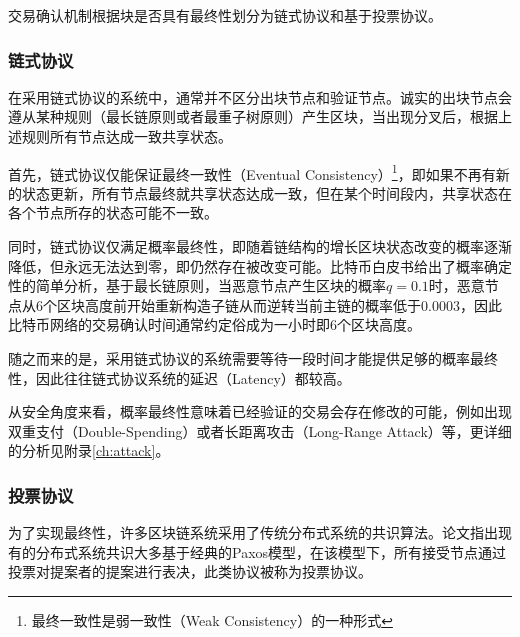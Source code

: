 交易确认机制根据块是否具有最终性划分为链式协议和基于投票协议\cite{wang2019survey}。

\subsubsection{链式协议}
在采用链式协议的系统中，通常并不区分出块节点和验证节点。诚实的出块节点会遵从某种规则（最长链原则或者最重子树原则）产生区块，当出现分叉后，根据上述规则所有节点达成一致共享状态。

首先，链式协议仅能保证最终一致性（Eventual Consistency）\footnote{最终一致性是弱一致性（Weak Consistency）的一种形式}，即如果不再有新的状态更新，所有节点最终就共享状态达成一致，但在某个时间段内，共享状态在各个节点所存的状态可能不一致\cite{brewer2000towards}。

同时，链式协议仅满足概率最终性，即随着链结构的增长区块状态改变的概率逐渐降低，但永远无法达到零，即仍然存在被改变可能。比特币白皮书\cite{nakamoto2008bitcoin}给出了概率确定性的简单分析，基于最长链原则，当恶意节点产生区块的概率$q=0.1$时，恶意节点从6个区块高度前开始重新构造子链从而逆转当前主链的概率低于$0.0003$，因此比特币网络的交易确认时间通常约定俗成为一小时即6个区块高度。

随之而来的是，采用链式协议的系统需要等待一段时间才能提供足够的概率最终性，因此往往链式协议系统的延迟（Latency）都较高\cite{bano2017consensus}。

从安全角度来看，概率最终性意味着已经验证的交易会存在修改的可能，例如出现双重支付（Double-Spending）或者长距离攻击（Long-Range Attack）等\cite{garay2015bitcoin,bahack2013theoretical}，更详细的分析见附录\ref{ch:attack}。



\subsubsection{投票协议}
为了实现最终性，许多区块链系统采用了传统分布式系统的共识算法。论文\cite{howard2019consensus}指出现有的分布式系统共识大多基于经典的Paxos模型\cite{lamport2001paxos}，在该模型下，所有接受节点通过投票对提案者的提案进行表决，此类协议被称为投票协议。

